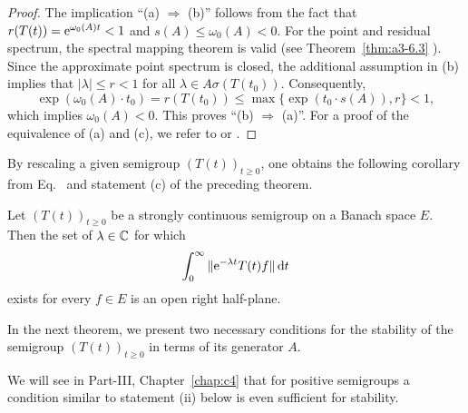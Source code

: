\begin{proof} The implication ``(a) $ \Rightarrow $ (b)'' follows from the fact that $ r(T(t)) = \mathrm{e}^{\omega_{0}(A) t} < 1 $ and $ s(A) \leq \omega_{0}(A) < 0 $. For the point and residual spectrum, the spectral mapping theorem is valid (see Theorem~\ref{thm:a3-6.3} ). Since the approximate point spectrum is closed, the additional assumption in (b)
implies that $ |\lambda| \leq r < 1 $ for all $ \lambda \in A\sigma(T(t_0)) $. 
Consequently, 
\[
\exp(\omega_{0}(A) \cdot t_0) = r(T(t_0)) \leq \max\{\exp(t_0 \cdot s(A)), r\} < 1,
\]
which implies $ \omega_{0}(A) < 0 $. 
This proves \textquotedblleft (b) $\Rightarrow$ (a)\textquotedblright. 
For a proof of the equivalence of (a) and (c), we refer to \textcite{datko:1972} or \textcite[Theorem~4.4.1]{pazy:1983}. 
\end{proof}
By rescaling a given semigroup $ (T(t))_{t \geq 0} $, one obtains the following corollary from Eq.~ and statement (c) of the preceding theorem.
\begin{corollary} \label{cor:a4-1.12} 
Let $ (T(t))_{t \geq 0} $ be a strongly continuous semigroup on a Banach space $ E $. Then the set of\/ $ \lambda \in \mathbb{C}$ for which
\[
\int_{0}^{\infty} \|\mathrm{e}^{-\lambda t} T (t) f \|  \mathop{}\!\mathrm{d}{t} 
\]
exists for every $ f \in E $  is an open right half-plane.
\end{corollary}
In the next theorem, we present two necessary conditions for the stability of the semigroup $ (T(t))_{t \geq 0} $ in terms of its generator $ A $. 

We will see in Part-III, Chapter~\ref{chap:c4} that for positive semigroups a condition similar to statement (ii) below is even sufficient for stability. 

